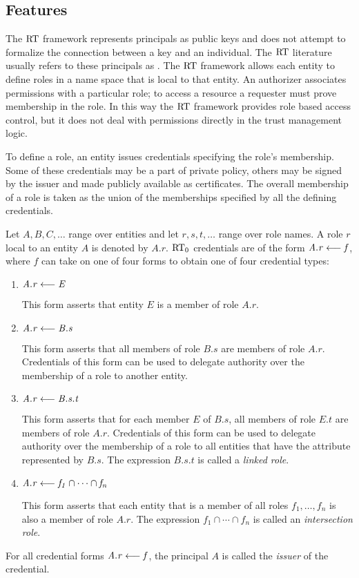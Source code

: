 \subsection{Features}

The $\text{RT}$ framework represents principals as public keys and does not attempt to formalize the
connection between a key and an individual. The $\text{RT}$ literature usually refers to these
principals as . The $\text{RT}$ framework allows each entity to define roles in a
name space that is local to that entity. An authorizer associates permissions with a particular
role; to access a resource a requester must prove membership in the role. In this way the $\text{RT}$
framework provides role based access control, but it does not deal with permissions directly in
the trust management logic.

To define a role, an entity issues credentials specifying the role's membership. Some of these
credentials may be a part of private policy, others may be signed by the issuer and made
publicly available as certificates. The overall membership of a role is taken as the union of
the memberships specified by all the defining credentials.

Let $A, B, C, \ldots$ range over entities and let $r, s, t, \ldots$ range over role names. A
role $r$ local to an entity $A$ is denoted by $A.r$. $\text{RT}_0$ credentials are of the form
$\mathit{A.r} \stackrel{}{\longleftarrow} \mathit{f}$, where $f$ can take on one of four forms to obtain one of four credential
types:
\begin{enumerate}

\item $\mathit{A.r} \stackrel{}{\longleftarrow} \mathit{E}$ 

 This form asserts that entity $E$ is a member of role $A.r$.

\item $\mathit{A.r} \stackrel{}{\longleftarrow} \mathit{B.s}$ 

  This form asserts that all members of role $B.s$ are members of role $A.r$. Credentials of
  this form can be used to delegate authority over the membership of a role to another entity.

\item $\mathit{A.r} \stackrel{}{\longleftarrow} \mathit{B.s.t}$ 

  This form asserts that for each member $E$ of $B.s$, all members of role $E.t$ are members of
  role $A.r$. Credentials of this form can be used to delegate authority over the membership of
  a role to all entities that have the attribute represented by $B.s$. The expression $B.s.t$ is
  called a \emph{linked role}.

\item $\mathit{A.r} \stackrel{}{\longleftarrow} \mathit{f_1 \cap \cdots \cap f_n}$
  
  This form asserts that each entity that is a member of all roles $f_1,\ldots, f_n$ is also a
  member of role $A.r$. The expression $f_1 \cap \cdots \cap f_n$ is called an
  \emph{intersection role}.

\end{enumerate}
For all credential forms $\mathit{A.r} \stackrel{}{\longleftarrow} \mathit{f}$, the principal $A$ is called the \emph{issuer} of the
credential.

